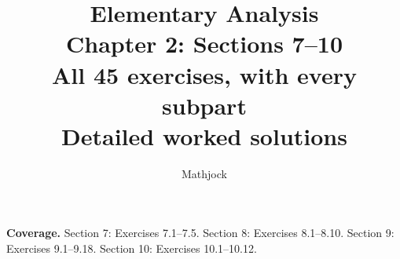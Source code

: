 
\title{\textbf{Elementary Analysis}\\[0.3em]
Chapter 2: Sections 7--10\\[0.4em]
\large All 45 exercises, with every subpart\\
Detailed worked solutions}
\author{Mathjock}
\date{}

\maketitle
\bookinfo
\par\textbf{Coverage.} Section 7: Exercises 7.1--7.5. Section 8: Exercises 8.1--8.10. Section 9: Exercises 9.1--9.18. Section 10: Exercises 10.1--10.12.
\tableofcontents
\clearpage
\setcounter{section}{6}

\clearpage

\clearpage

\clearpage


